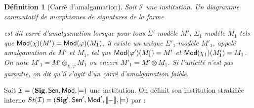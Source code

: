 \documentclass[11pt,a4paper]{report}
\newtheorem{defi}[theo]{Définition}
\newcommand{\ph}{\varphi}
\newcommand{\gr}{\textbf}
\newcommand{\il}{\textit}
\newcommand{\I}{\mathcal{I}}
\newcommand{\lb}{\llbracket}
\newcommand{\rb}{\rrbracket}
\newcommand{\info}[1]{\text{{\fontfamily{lmss}\selectfont #1}}}
\newcommand{\Mod}{\info{Mod}}
\newcommand{\Sen}{\info{Sen}}
\newcommand{\1}{\mathbbm{1}}
\begin{document}
\begin{defi}[Carré d'amalgamation]
Soit $\I$ une institution. Un diagramme commutatif de morphismes de signatures de la forme
\begin{center}
\end{center}
est dit \il{carré d'amalgamation} lorsque pour tous $\Sigma'$-modèle $M'$, $\Sigma_1$-modèle $M_1$ tels que $\Mod(\chi)(M') = \Mod(\ph)(M_1)$, il existe un unique $\Sigma'_1$-modèle $M'_1$, appelé \il{amalgamation} de $M'$ et $M_1$, tel que $\Mod(\ph')(M'_1) = M'$ et $\Mod(\chi_1)(M'_1) = M_1$. On note $M'_1 = M' \otimes_{\chi,\ph} M_1$ ou encore $M'_1 = M' \otimes M_1$. Si l'unicité n'est pas garantie, on dit qu'il s'agit d'un \il{carré d'amalgamation faible}.
\end{defi}
Soit $\I = (\gr{Sig}, \Sen, \Mod, \models)$ une institution. On définit son institution stratifiée interne $St(\I) = (\gr{Sig}', \Sen', \Mod', \lb - \rb, \models)$ par :
\end{document}
